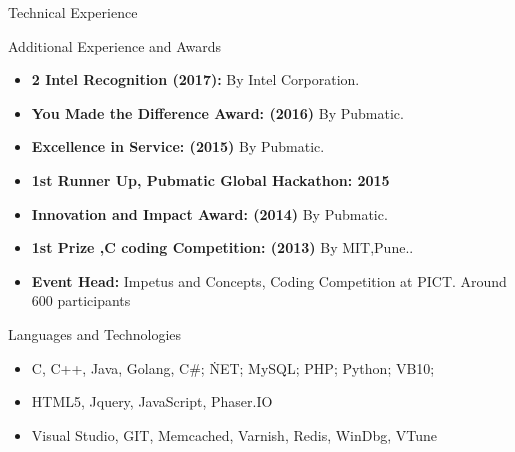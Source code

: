 \documentclass[]{mcdowellcv}
\begin{document}
\begin{cvsection}{Technical Experience}
	\end{cvsection}
	
	\begin{cvsection}{Additional Experience and Awards}
		\begin{cvsubsection}{}{}{}	
			\begin{itemize}
				\item \textbf{2 Intel Recognition (2017):} By Intel Corporation.
				\item \textbf{You Made the Difference Award: (2016)} By Pubmatic.
				\item \textbf{Excellence in Service: (2015)} By Pubmatic.
				\item \textbf{1st Runner Up, Pubmatic Global Hackathon: 2015}
				\item \textbf{Innovation and Impact Award: (2014) } By Pubmatic.
				\item \textbf{1st Prize ,C coding Competition: (2013)} By MIT,Pune..
				\item \textbf{Event Head:} Impetus and Concepts, Coding Competition at PICT. Around 600 participants
			\end{itemize}
		\end{cvsubsection}
	\end{cvsection}
	
	\begin{cvsection}{Languages and Technologies}
		\begin{cvsubsection}{}{}{}	
			\begin{itemize}
				\item  C, C++, Java, Golang, C\#; \.NET; MySQL; PHP; Python; VB10; 
				\item HTML5, Jquery, JavaScript, Phaser.IO
				\item Visual Studio, GIT, Memcached, Varnish, Redis, WinDbg, VTune
			\end{itemize}
		\end{cvsubsection}
	\end{cvsection}
	
\end{document}
